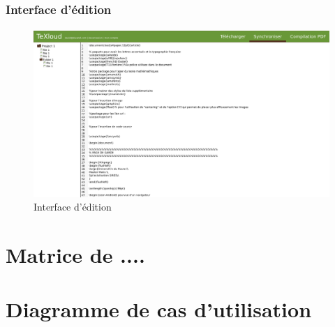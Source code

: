 \documentclass[a4paper,12pt]{article}
\begin{document}
\newpage
\subsubsection{Interface d'édition}
\paragraph{}
\begin{figure}[!ht]
\begin{center}
  \includegraphics[width=1\textwidth, angle=90]{../layout/layout_texloud_std.png}
\end{center}
  \caption{Interface d'édition}
  \label{uiEdit}
\end{figure}

\newpage
\section{Matrice de ....}


\appendix
\newpage

\section{Diagramme de cas d'utilisation}
\end{document}

